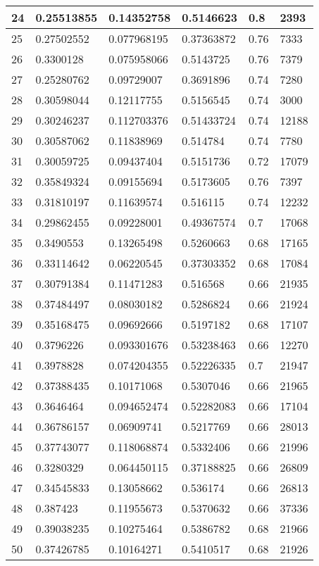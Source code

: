 \begin{longtable}{|l|l|l|l|l|l|}
24 & 0.25513855 & 0.14352758 & 0.5146623 & 0.8 & 2393 \\ \hline 
25 & 0.27502552 & 0.077968195 & 0.37363872 & 0.76 & 7333 \\ \hline 
26 & 0.3300128 & 0.075958066 & 0.5143725 & 0.76 & 7379 \\ \hline 
27 & 0.25280762 & 0.09729007 & 0.3691896 & 0.74 & 7280 \\ \hline 
28 & 0.30598044 & 0.12117755 & 0.5156545 & 0.74 & 3000 \\ \hline 
29 & 0.30246237 & 0.112703376 & 0.51433724 & 0.74 & 12188 \\ \hline 
30 & 0.30587062 & 0.11838969 & 0.514784 & 0.74 & 7780 \\ \hline 
31 & 0.30059725 & 0.09437404 & 0.5151736 & 0.72 & 17079 \\ \hline 
32 & 0.35849324 & 0.09155694 & 0.5173605 & 0.76 & 7397 \\ \hline 
33 & 0.31810197 & 0.11639574 & 0.516115 & 0.74 & 12232 \\ \hline 
34 & 0.29862455 & 0.09228001 & 0.49367574 & 0.7 & 17068 \\ \hline 
35 & 0.3490553 & 0.13265498 & 0.5260663 & 0.68 & 17165 \\ \hline 
36 & 0.33114642 & 0.06220545 & 0.37303352 & 0.68 & 17084 \\ \hline 
37 & 0.30791384 & 0.11471283 & 0.516568 & 0.66 & 21935 \\ \hline 
38 & 0.37484497 & 0.08030182 & 0.5286824 & 0.66 & 21924 \\ \hline 
39 & 0.35168475 & 0.09692666 & 0.5197182 & 0.68 & 17107 \\ \hline 
40 & 0.3796226 & 0.093301676 & 0.53238463 & 0.66 & 12270 \\ \hline 
41 & 0.3978828 & 0.074204355 & 0.52226335 & 0.7 & 21947 \\ \hline 
42 & 0.37388435 & 0.10171068 & 0.5307046 & 0.66 & 21965 \\ \hline 
43 & 0.3646464 & 0.094652474 & 0.52282083 & 0.66 & 17104 \\ \hline 
44 & 0.36786157 & 0.06909741 & 0.5217769 & 0.66 & 28013 \\ \hline 
45 & 0.37743077 & 0.118068874 & 0.5332406 & 0.66 & 21996 \\ \hline 
46 & 0.3280329 & 0.064450115 & 0.37188825 & 0.66 & 26809 \\ \hline 
47 & 0.34545833 & 0.13058662 & 0.536174 & 0.66 & 26813 \\ \hline 
48 & 0.387423 & 0.11955673 & 0.5370632 & 0.66 & 37336 \\ \hline 
49 & 0.39038235 & 0.10275464 & 0.5386782 & 0.68 & 21966 \\ \hline 
50 & 0.37426785 & 0.10164271 & 0.5410517 & 0.68 & 21926 \\ \hline 
\end{longtable}